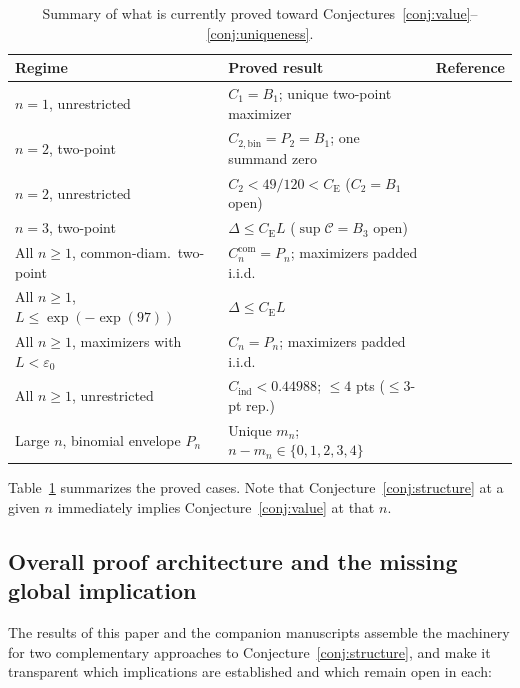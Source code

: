 \documentclass[11pt]{article}
\numberwithin{equation}{section}
\theoremstyle{definition}
\theoremstyle{remark}
\newcommand{\ce}{C_{\mathrm E}}
\newcommand{\Cind}{C_{\mathrm{ind}}}
\newcommand{\eps}{\varepsilon}
\begin{document}
\begin{table}[t]
\centering
\caption{Summary of what is currently proved toward Conjectures~\ref{conj:value}--\ref{conj:uniqueness}.}
\label{tab:status-summary}
\smallskip
\small
\begin{tabular}{@{}lll@{}}
\toprule
Regime & Proved result & Reference \\
\midrule
$n=1$, unrestricted & $C_1=B_1$; unique two-point maximizer & \citet{BentkusKirsa1989} \\
$n=2$, two-point & $C_{2,\mathrm{bin}}=P_2=B_1$; one summand zero & \citet[Thm.~1.2]{BellBernoulli2026} \\
$n=2$, unrestricted & $C_2<49/120<\ce$ ($C_2=B_1$ open) & \citet[Thm.~1.1]{BellFinite2026} \\
$n=3$, two-point & $\Delta\le\ce L$ ($\sup\mathcal C=B_3$ open) & \citet[Thm.~1.2(i)]{BellFinite2026} \\
All $n\ge1$, common-diam.\ two-point & $C_n^{\mathrm{com}}=P_n$; maximizers padded i.i.d. & \citet[Thm.~1.1]{BellBernoulli2026} \\
All $n\ge1$, $L\le\exp(-\exp(97))$ & $\Delta\le\ce L$ & \citet[Thm.~1.1]{BellSmall2026} \\
All $n\ge1$, maximizers with $L<\eps_0$ & $C_n=P_n$; maximizers padded i.i.d. & \citet[Thm.~1.2]{BellSmallStructure2026} \\
All $n\ge1$, unrestricted & $\Cind<0.44988$; $\le4$ pts ($\le3$-pt rep.) & \citet{BellIndependent2026,BellExtremizers2026} \\
Large $n$, binomial envelope $P_n$ & Unique $m_n$; $n-m_n\in\{0,1,2,3,4\}$ & \citet[Thm.~4.1]{BellBernoulli2026} \\
\bottomrule
\end{tabular}
\end{table}

Table~\ref{tab:status-summary} summarizes the proved cases. Note that
Conjecture~\ref{conj:structure} at a given $n$ immediately implies
Conjecture~\ref{conj:value} at that $n$.

\subsection{Overall proof architecture and the missing global implication}\label{subsec:missing-implication}

The results of this paper and the companion manuscripts assemble the
machinery for two complementary approaches to Conjecture~\ref{conj:structure},
and make it transparent which implications are established and which remain
open in each:
\end{document}
